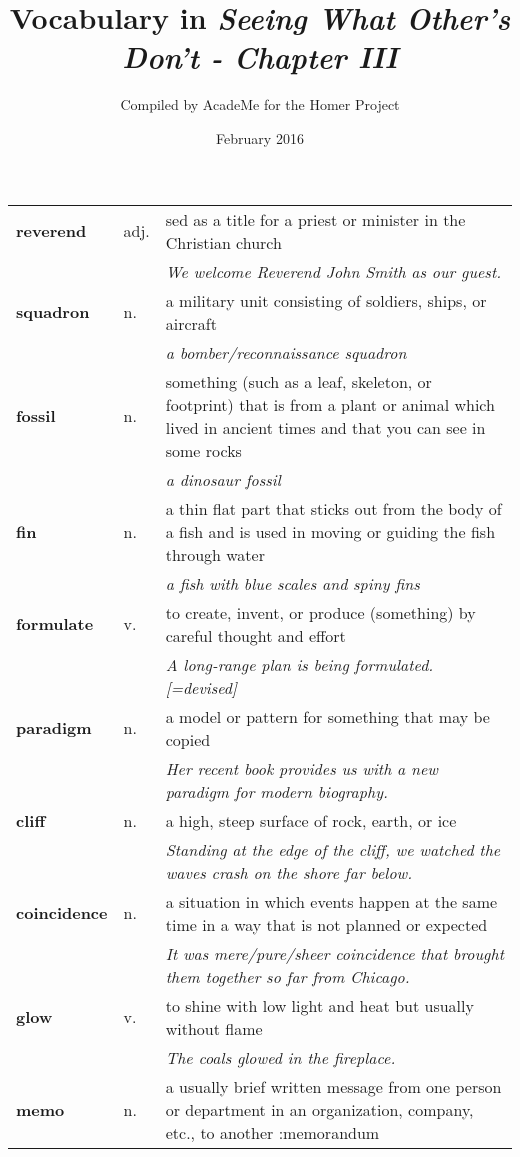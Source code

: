 \documentclass[a4paper]{article}
\title{Vocabulary in \textit{Seeing What Other's Don't - Chapter III }}
\author{Compiled by AcadeMe for the Homer Project}
\date{February 2016}
\begin{document}
\maketitle
\begin{longtable}{llp{11cm}}
\textbf{reverend} & adj. &  sed as a title for a priest or minister in the Christian church \\
 & & \textit{We welcome Reverend John Smith as our guest.}\\[0.08cm]
\textbf{squadron} & n. &  a military unit consisting of soldiers, ships, or aircraft \\
 & & \textit{a bomber/reconnaissance squadron}\\[0.08cm]
\textbf{fossil} & n. &  something (such as a leaf, skeleton, or footprint) that is from a plant or animal which lived in ancient times and that you can see in some rocks \\
 & & \textit{a dinosaur fossil}\\[0.08cm]
\textbf{fin} & n. &  a thin flat part that sticks out from the body of a fish and is used in moving or guiding the fish through water \\
 & & \textit{a fish with blue scales and spiny fins}\\[0.08cm]
\textbf{formulate} & v. &  to create, invent, or produce (something) by careful thought and effort \\
 & & \textit{A long-range plan is being formulated. [=devised]}\\[0.08cm]
\textbf{paradigm} & n. &  a model or pattern for something that may be copied \\
 & & \textit{Her recent book provides us with a new paradigm for modern biography.}\\[0.08cm]
\textbf{cliff} & n. &  a high, steep surface of rock, earth, or ice \\
 & & \textit{Standing at the edge of the cliff, we watched the waves crash on the shore far below.}\\[0.08cm]
\textbf{coincidence} & n. &  a situation in which events happen at the same time in a way that is not planned or expected \\
 & & \textit{It was mere/pure/sheer coincidence that brought them together so far from Chicago.}\\[0.08cm]
\textbf{glow} & v. &  to shine with low light and heat but usually without flame \\
 & & \textit{The coals glowed in the fireplace.}\\[0.08cm]
\textbf{memo} & n. &  a usually brief written message from one person or department in an organization, company, etc., to another :memorandum \\

\end{longtable}
\end{document}
